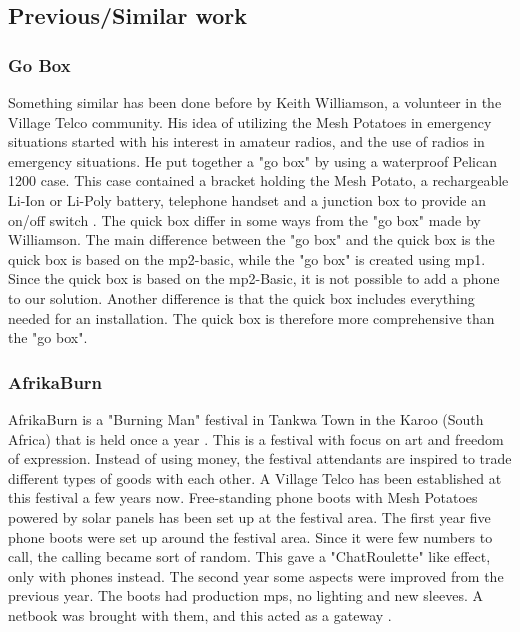  
\subsection{Previous/Similar work}

\subsubsection{Go Box} Something similar has been done before by Keith Williamson, a volunteer in the Village Telco community. His idea of utilizing the Mesh Potatoes in emergency situations started with his interest in amateur radios, and the use of radios in emergency situations. He put together a "go box" by using a waterproof Pelican 1200 case. This case contained a bracket holding the Mesh Potato, a rechargeable Li-Ion or Li-Poly battery, telephone handset and a junction box to provide an on/off switch \cite{keith}. The \gls{quick} box differ in some ways from the "go box" made by Williamson. The main difference between the "go box" and the \gls{quick} box is the \gls{quick} box is based on the \gls{mp2}-basic, while the "go box" is created using \gls{mp1}. Since the \gls{quick} box is based on the \gls{mp2}-Basic, it is not possible to add a phone to our solution. Another difference is that the \gls{quick} box includes everything needed for an installation. The \gls{quick} box is therefore more comprehensive than the "go box".

\subsubsection{AfrikaBurn}
AfrikaBurn is a "Burning Man" festival in Tankwa Town in the Karoo (South Africa) that is held once a year \cite{whatisafrikaburn}. This is a festival with focus on art and freedom of expression. Instead of using money, the festival attendants are inspired to trade different types of goods with each other. A Village Telco has been established at this festival a few years now. Free-standing phone boots with Mesh Potatoes powered by solar panels has been set up at the festival area. The first year five phone boots were set up around the festival area. Since it were few numbers to call, the calling became sort of random. This gave a  "ChatRoulette" like effect, only with phones instead. The second year some aspects were improved from the previous year. The boots had production \glspl{mp}, no lighting and new sleeves. A netbook was brought with them, and this acted as a gateway \cite{africaburnforavillagetelco,africaburnsagainforavillagetelco}. 

